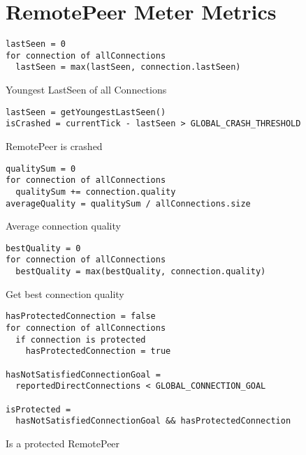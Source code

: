 \section{RemotePeer Meter Metrics}
\begin{Listing}[H]
\begin{lstlisting}[xleftmargin=3em]
lastSeen = 0
for connection of allConnections
  lastSeen = max(lastSeen, connection.lastSeen)
\end{lstlisting}
\caption{Youngest LastSeen of all Connections}
\label{lst:mit-last-seen}
\end{Listing}

\begin{Listing}[H]
\begin{lstlisting}[xleftmargin=3em]
lastSeen = getYoungestLastSeen()
isCrashed = currentTick - lastSeen > GLOBAL_CRASH_THRESHOLD
\end{lstlisting}
\caption{RemotePeer is crashed}
\label{lst:mit-crashed}
\end{Listing}

\begin{Listing}[H]
\begin{lstlisting}[xleftmargin=3em]
qualitySum = 0
for connection of allConnections
  qualitySum += connection.quality
averageQuality = qualitySum / allConnections.size  
\end{lstlisting}
\caption{Average connection quality}
\label{lst:mit-average-connection-quality}
\end{Listing}

\begin{Listing}[H]
\begin{lstlisting}[xleftmargin=3em]
bestQuality = 0
for connection of allConnections
  bestQuality = max(bestQuality, connection.quality)
\end{lstlisting}
\caption{Get best connection quality}
\label{lst:mit-best-connection-quality}
\end{Listing}

\begin{Listing}[H]
\begin{lstlisting}[xleftmargin=3em]
hasProtectedConnection = false
for connection of allConnections
  if connection is protected
    hasProtectedConnection = true
    
hasNotSatisfiedConnectionGoal = 
  reportedDirectConnections < GLOBAL_CONNECTION_GOAL 

isProtected = 
  hasNotSatisfiedConnectionGoal && hasProtectedConnection  
\end{lstlisting}
\caption{Is a protected RemotePeer}
\label{lst:mit-welpenschutz}
\end{Listing}

